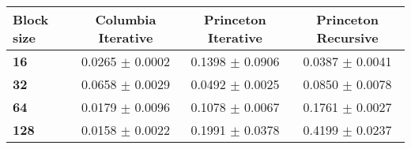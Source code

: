 \begin{tabular}{lccc}\toprule
\textbf{Block size}  & \textbf{Columbia Iterative} & \textbf{Princeton Iterative} & \textbf{Princeton Recursive}\\\midrule
\textbf{16}  & 0.0265 $\pm$ 0.0002 & 0.1398 $\pm$ 0.0906 & 0.0387 $\pm$ 0.0041\\
\textbf{32}  & 0.0658 $\pm$ 0.0029 & 0.0492 $\pm$ 0.0025 & 0.0850 $\pm$ 0.0078\\
\textbf{64}  & 0.0179 $\pm$ 0.0096 & 0.1078 $\pm$ 0.0067 & 0.1761 $\pm$ 0.0027\\
\textbf{128} & 0.0158 $\pm$ 0.0022 & 0.1991 $\pm$ 0.0378 & 0.4199 $\pm$ 0.0237\\
\bottomrule
\end{tabular}
